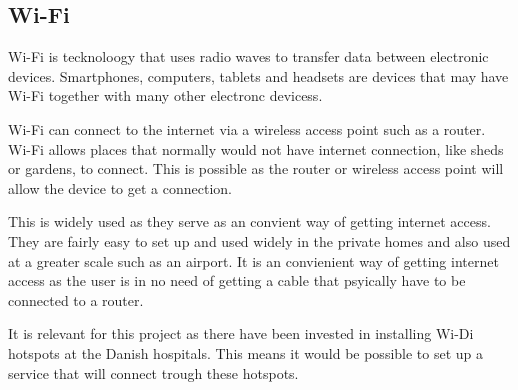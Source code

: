 \subsection{Wi-Fi}
Wi-Fi is  tecknoloogy that uses radio waves to transfer data between electronic devices. Smartphones, computers, tablets and headsets are devices that may have Wi-Fi together with many other electronc devicess\cite{wifi_devices}.

Wi-Fi can connect to the internet via a wireless access point such as a router. Wi-Fi allows places that normally would not have internet connection, like sheds or gardens, to connect. This is possible as the router or wireless access point will allow the device to get a connection.

This is widely used as they serve as an convient way of getting internet access. They are fairly easy to set up and used widely in the private homes and also used at a greater scale such as an airport\cite{wifi_works}. It is an convienient way of getting internet access as the user is in no need of getting a cable that psyically have to be connected to a router.

It is relevant for this project as there have been invested in installing Wi-Di hotspots at the Danish hospitals\cite{wifi_hospi}. This means it would be possible to set up a service that will connect trough these hotspots.



